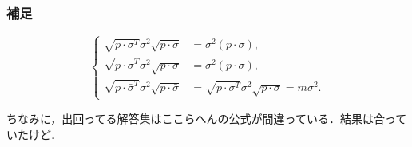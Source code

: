\documentclass[pdflatex,unicode,ja=standard,12pt]{beamer}
\begin{document}
\begin{frame}[noframenumbering]

  \frametitle{補足 \subsecname}
  \thispagestyle{empty}  

  \begin{equation}
    \left\{
      \begin{alignedat}{1}
        \sqrt{p\cdot\sigma^{T}}
        \sigma^2
        \sqrt{p\cdot\bar{\sigma}}
        &=
        \sigma^2
        (p\cdot\bar{\sigma})
        ,
        \\
        \sqrt{p\cdot\bar{\sigma}^{T}}
        \sigma^2
        \sqrt{p\cdot\sigma}
        &=
        \sigma^2(p\cdot\sigma)
        ,
        \\
        \sqrt{p\cdot\bar{\sigma}^{T}}
        \sigma^2
        \sqrt{p\cdot\bar{\sigma}}
        &=
        \sqrt{p\cdot\sigma^{T}}
        \sigma^2
        \sqrt{p\cdot\sigma}
        =
        m\sigma^2
        .
      \end{alignedat}
    \right.
    \label{formula08}
  \end{equation}

  \vspace{10pt}

  ちなみに，出回ってる解答集\cite{solution}はここらへんの公式が間違っている．結果は合っていたけど．

\end{frame}
\end{document}
